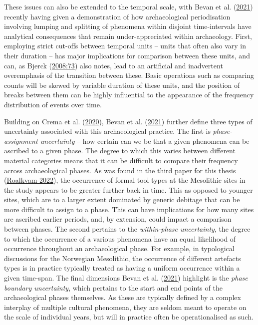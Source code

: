 \documentclass[
  a4paper,
  oneside]{uiophdthesis}
\begin{document}
These issues can also be extended to the temporal scale, with Bevan et al. (\protect\hyperlink{ref-bevan2021}{2021}) recently having given a demonstration of how archaeological periodisation involving lumping and splitting of phenomena within disjoint time-intervals have analytical consequences that remain under-appreciated within archaeology. First, employing strict cut-offs between temporal units -- units that often also vary in their duration -- has major implications for comparison between these units, and can, as Bjerck (\protect\hyperlink{ref-bjerck2008}{2008:73}) also notes, lead to an artificial and inadvertent overemphasis of the transition between these. Basic operations such as comparing counts will be skewed by variable duration of these units, and the position of breaks between them can be highly influential to the appearance of the frequency distribution of events over time.

Building on Crema et al. (\protect\hyperlink{ref-crema2020}{2020}), Bevan et al. (\protect\hyperlink{ref-bevan2021}{2021}) further define three types of uncertainty associated with this archaeological practice. The first is \emph{phase-assignment uncertainty} -- how certain can we be that a given phenomena can be ascribed to a given phase. The degree to which this varies between different material categories means that it can be difficult to compare their frequency across archaeological phases. As was found in the third paper for this thesis (\protect\hyperlink{ref-roalkvam2022}{Roalkvam 2022}), the occurrence of formal tool types at the Mesolithic sites in the study appears to be greater further back in time. This as opposed to younger sites, which are to a larger extent dominated by generic debitage that can be more difficult to assign to a phase. This can have implications for how many sites are ascribed earlier periods, and, by extension, could impact a comparison between phases. The second pertains to the \emph{within-phase uncertainty}, the degree to which the occurrence of a various phenomena have an equal likelihood of occurrence throughout an archaeological phase. For example, in typological discussions for the Norwegian Mesolithic, the occurrence of different artefacts types is in practice typically treated as having a uniform occurrence within a given time-span. The final dimensions Bevan et al. (\protect\hyperlink{ref-bevan2021}{2021}) highlight is the \emph{phase boundary uncertainty}, which pertains to the start and end points of the archaeological phases themselves. As these are typically defined by a complex interplay of multiple cultural phenomena, they are seldom meant to operate on the scale of individual years, but will in practice often be operationalised as such.
\end{document}
